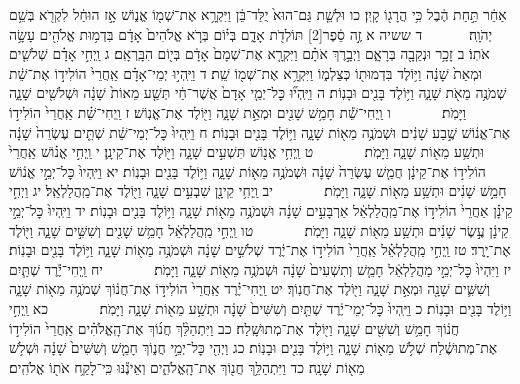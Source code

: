 \documentclass[twoside, openany, parskip=half, 11pt]{book}
\begin{document}
אַחֵ֔ר תַּ֣חַת הֶ֔בֶל כִּ֥י הֲרָג֖וֹ קָֽיִן׃ כו וּלְשֵׁ֤ת גַּם־הוּא֙ יֻלַּד־בֵּ֔ן וַיִּקְרָ֥א אֶת־שְׁמ֖וֹ אֱנ֑וֹשׁ אָ֣ז הוּחַ֔ל לִקְרֹ֖א בְּשֵׁ֥ם יְהֹוָֽה׃
　　　ד ששיה א זֶ֣ה סֵ֔פֶר‏[2] תּוֹלְדֹ֖ת אָדָ֑ם בְּי֗וֹם בְּרֹ֤א אֱלֹהִים֙ אָדָ֔ם בִּדְמ֥וּת אֱלֹהִ֖ים עָשָׂ֥ה אֹתֽוֹ׃ ב זָכָ֥ר וּנְקֵבָ֖ה בְּרָאָ֑ם וַיְבָ֣רֶךְ אֹתָ֗ם וַיִּקְרָ֤א אֶת־שְׁמָם֙ אָדָ֔ם בְּי֖וֹם הִבָּֽרְאָֽם׃ ג וַֽיְחִ֣י אָדָ֗ם שְׁלֹשִׁ֤ים וּמְאַת֙ שָׁנָ֔ה וַיּ֥וֹלֶד בִּדְמוּת֖וֹ כְּצַלְמ֑וֹ וַיִּקְרָ֥א אֶת־שְׁמ֖וֹ שֵֽׁת׃ ד וַיִּֽהְי֣וּ יְמֵי־אָדָ֗ם אַֽחֲרֵי֙ הוֹלִיד֣וֹ אֶת־שֵׁ֔ת שְׁמֹנֶ֥ה מֵאֹ֖ת שָׁנָ֑ה וַיּ֥וֹלֶד בָּנִ֖ים וּבָנֽוֹת׃ ה וַיִּֽהְי֞וּ כׇּל־יְמֵ֤י אָדָם֙ אֲשֶׁר־חַ֔י תְּשַׁ֤ע מֵאוֹת֙ שָׁנָ֔ה וּשְׁלֹשִׁ֖ים שָׁנָ֑ה וַיָּמֹֽת׃
　　　 ו וַֽיְחִי־שֵׁ֕ת חָמֵ֥שׁ שָׁנִ֖ים וּמְאַ֣ת שָׁנָ֑ה וַיּ֖וֹלֶד אֶת־אֱנֽוֹשׁ׃ ז וַֽיְחִי־שֵׁ֗ת אַֽחֲרֵי֙ הוֹלִיד֣וֹ אֶת־אֱנ֔וֹשׁ שֶׁ֣בַע שָׁנִ֔ים וּשְׁמֹנֶ֥ה מֵא֖וֹת שָׁנָ֑ה וַיּ֥וֹלֶד בָּנִ֖ים וּבָנֽוֹת׃ ח וַיִּֽהְיוּ֙ כׇּל־יְמֵי־שֵׁ֔ת שְׁתֵּ֤ים עֶשְׂרֵה֙ שָׁנָ֔ה וּתְשַׁ֥ע מֵא֖וֹת שָׁנָ֑ה וַיָּמֹֽת׃
　　　 ט וַֽיְחִ֥י אֱנ֖וֹשׁ תִּשְׁעִ֣ים שָׁנָ֑ה וַיּ֖וֹלֶד אֶת־קֵינָֽן׃ י וַֽיְחִ֣י אֱנ֗וֹשׁ אַֽחֲרֵי֙ הוֹלִיד֣וֹ אֶת־קֵינָ֔ן חֲמֵ֤שׁ עֶשְׂרֵה֙ שָׁנָ֔ה וּשְׁמֹנֶ֥ה מֵא֖וֹת שָׁנָ֑ה וַיּ֥וֹלֶד בָּנִ֖ים וּבָנֽוֹת׃ יא וַיִּֽהְיוּ֙ כׇּל־יְמֵ֣י אֱנ֔וֹשׁ חָמֵ֣שׁ שָׁנִ֔ים וּתְשַׁ֥ע מֵא֖וֹת שָׁנָ֑ה וַיָּמֹֽת׃
　　　 יב וַֽיְחִ֥י קֵינָ֖ן שִׁבְעִ֣ים שָׁנָ֑ה וַיּ֖וֹלֶד אֶת־מַֽהֲלַלְאֵֽל׃ יג וַיְחִ֣י קֵינָ֗ן אַחֲרֵי֙ הוֹלִיד֣וֹ אֶת־מַֽהֲלַלְאֵ֔ל אַרְבָּעִ֣ים שָׁנָ֔ה וּשְׁמֹנֶ֥ה מֵא֖וֹת שָׁנָ֑ה וַיּ֥וֹלֶד בָּנִ֖ים וּבָנֽוֹת׃ יד וַיִּֽהְיוּ֙ כׇּל־יְמֵ֣י קֵינָ֔ן עֶ֣שֶׂר שָׁנִ֔ים וּתְשַׁ֥ע מֵא֖וֹת שָׁנָ֑ה וַיָּמֹֽת׃
　　　 טו וַֽיְחִ֣י מַֽהֲלַלְאֵ֔ל חָמֵ֥שׁ שָׁנִ֖ים וְשִׁשִּׁ֣ים שָׁנָ֑ה וַיּ֖וֹלֶד אֶת־יָֽרֶד׃ טז וַֽיְחִ֣י מַֽהֲלַלְאֵ֗ל אַֽחֲרֵי֙ הוֹלִיד֣וֹ אֶת־יֶ֔רֶד שְׁלֹשִׁ֣ים שָׁנָ֔ה וּשְׁמֹנֶ֥ה מֵא֖וֹת שָׁנָ֑ה וַיּ֥וֹלֶד בָּנִ֖ים וּבָנֽוֹת׃ יז וַיִּהְיוּ֙ כׇּל־יְמֵ֣י מַהֲלַלְאֵ֔ל חָמֵ֤שׁ וְתִשְׁעִים֙ שָׁנָ֔ה וּשְׁמֹנֶ֥ה מֵא֖וֹת שָׁנָ֑ה וַיָּמֹֽת׃
　　　 יח וַֽיְחִי־יֶ֕רֶד שְׁתַּ֧יִם וְשִׁשִּׁ֛ים שָׁנָ֖ה וּמְאַ֣ת שָׁנָ֑ה וַיּ֖וֹלֶד אֶת־חֲנֽוֹךְ׃ יט וַֽיְחִי־יֶ֗רֶד אַֽחֲרֵי֙ הוֹלִיד֣וֹ אֶת־חֲנ֔וֹךְ שְׁמֹנֶ֥ה מֵא֖וֹת שָׁנָ֑ה וַיּ֥וֹלֶד בָּנִ֖ים וּבָנֽוֹת׃ כ וַיִּֽהְיוּ֙ כׇּל־יְמֵי־יֶ֔רֶד שְׁתַּ֤יִם וְשִׁשִּׁים֙ שָׁנָ֔ה וּתְשַׁ֥ע מֵא֖וֹת שָׁנָ֑ה וַיָּמֹֽת׃
　　　 כא וַֽיְחִ֣י חֲנ֔וֹךְ חָמֵ֥שׁ וְשִׁשִּׁ֖ים שָׁנָ֑ה וַיּ֖וֹלֶד אֶת־מְתוּשָֽׁלַח׃ כב וַיִּתְהַלֵּ֨ךְ חֲנ֜וֹךְ אֶת־הָֽאֱלֹהִ֗ים אַֽחֲרֵי֙ הוֹלִיד֣וֹ אֶת־מְתוּשֶׁ֔לַח שְׁלֹ֥שׁ מֵא֖וֹת שָׁנָ֑ה וַיּ֥וֹלֶד בָּנִ֖ים וּבָנֽוֹת׃ כג וַיְהִ֖י כׇּל־יְמֵ֣י חֲנ֑וֹךְ חָמֵ֤שׁ וְשִׁשִּׁים֙ שָׁנָ֔ה וּשְׁלֹ֥שׁ מֵא֖וֹת שָׁנָֽה׃ כד וַיִּתְהַלֵּ֥ךְ חֲנ֖וֹךְ אֶת־הָֽאֱלֹהִ֑ים וְאֵינֶ֕נּוּ כִּֽי־לָקַ֥ח אֹת֖וֹ אֱלֹהִֽים׃
\end{document}
